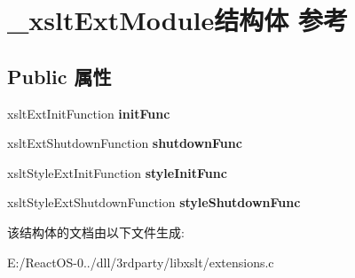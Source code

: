 \hypertarget{struct__xslt_ext_module}{}\section{\+\_\+xslt\+Ext\+Module结构体 参考}
\label{struct__xslt_ext_module}
\subsection*{Public 属性}
\begin{DoxyCompactItemize}
\item 
\mbox{\label{struct__xslt_ext_module_a1f2e8bfde831fa7755061a516be4b635}} 
xslt\+Ext\+Init\+Function {\bfseries init\+Func}
\item 
\mbox{\label{struct__xslt_ext_module_a5cb3eb6b0ffcab315860411ea4eb4961}} 
xslt\+Ext\+Shutdown\+Function {\bfseries shutdown\+Func}
\item 
\mbox{\label{struct__xslt_ext_module_a61fccd2f75f55d2aba8d7ce092651e9e}} 
xslt\+Style\+Ext\+Init\+Function {\bfseries style\+Init\+Func}
\item 
\mbox{\label{struct__xslt_ext_module_af2eed0320cd0ada538c56a4807075ea5}} 
xslt\+Style\+Ext\+Shutdown\+Function {\bfseries style\+Shutdown\+Func}
\end{DoxyCompactItemize}


该结构体的文档由以下文件生成\+:\begin{DoxyCompactItemize}
\item 
E\+:/\+React\+O\+S-\/0../dll/3rdparty/libxslt/extensions.\+c\end{DoxyCompactItemize}
